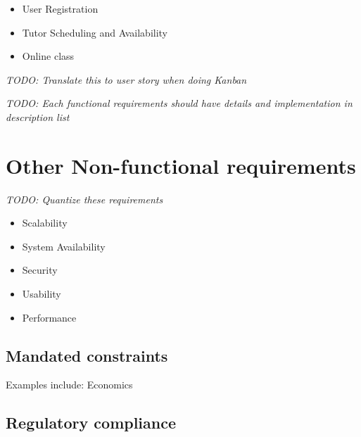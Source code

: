 \begin{itemize}
	\item User Registration
	\item Tutor Scheduling and Availability
	\item Online class
\end{itemize}

\textit{TODO: Translate this to user story when doing Kanban}

\textit{TODO: Each functional requirements should have details and implementation in description list}

\section{Other Non-functional requirements}

\textit{TODO: Quantize these requirements}

\begin{itemize}
	\item Scalability
	\item System Availability
	\item Security
	\item Usability
	\item Performance
\end{itemize}

\subsection{Mandated constraints}

Examples include: Economics

\subsection{Regulatory compliance}

\clearpage